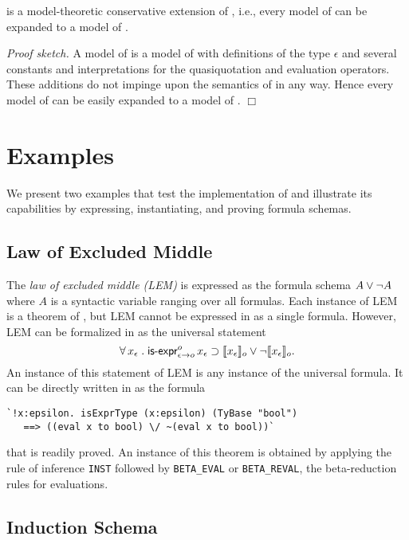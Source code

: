 \documentclass[fleqn]{llncs}
\begin{document}
\begin{theorem}\bsp
{\HLQE} is a model-theoretic conservative extension of {\HL}, i.e.,
every model of {\HL} can be expanded to a model of {\HLQE}.\esp
\end{theorem}

\noindent
\emph{Proof sketch.}  A model of {\HLQE} is a model of {\HL} with
definitions of the type $\epsilon$ and several constants and
interpretations for the quasiquotation and evaluation operators.
These additions do not impinge upon the semantics of {\HL} in any way.
Hence every model of {\HL} can be easily expanded to a model of
{\HLQE}.  $\Box$

\section{Examples}\label{sec:examples}

\bsp
We present two examples that test the implementation
of {\HLQE} and illustrate its capabilities by expressing,
instantiating, and proving formula schemas.
\esp

\subsection{Law of Excluded Middle}

The \emph{law of excluded middle (LEM)} is expressed as the formula
schema $A \vee \neg A$ where $A$ is a syntactic variable ranging over
all formulas.  Each instance of LEM is a theorem of {\HOL}, but LEM
cannot be expressed in {\HOL} as a single formula.  However, LEM can
be formalized in {\churchqe} as the universal statement
\[\forall\, x_\epsilon \mathrel. 
\mbox{\sf is-expr}_{\epsilon \rightarrow o}^{o} \, x_\epsilon \supset
\llbracket x_\epsilon\rrbracket_o \vee \neg \llbracket x_\epsilon\rrbracket_o.\] An
instance of this statement of LEM is any instance of the universal
formula. It can be directly written in {\HLQE} as the formula
\begin{lstlisting}
`!x:epsilon. isExprType (x:epsilon) (TyBase "bool")
   ==> ((eval x to bool) \/ ~(eval x to bool))`
\end{lstlisting}
that is readily proved.  An instance of this theorem is obtained by
applying the rule of inference \texttt{INST} followed by
\texttt{BETA\_EVAL} or \texttt{BETA\_REVAL}, the beta-reduction rules
for evaluations.

\subsection{Induction Schema}
\end{document}
